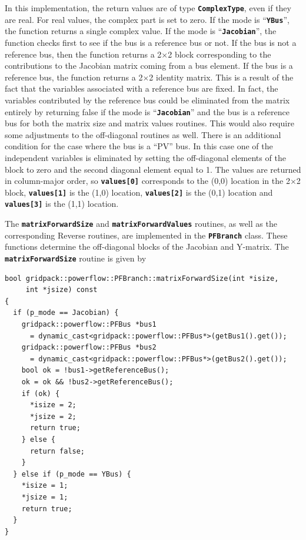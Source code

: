 In this implementation, the return values are of type \texttt{\textbf{ComplexType}}, even if they are real. For real values, the complex part is set to zero. If the mode is ``\texttt{\textbf{YBus}}'', the function returns a single complex value. If the mode is ``\texttt{\textbf{Jacobian}}'', the function checks first to see if the bus is a reference bus or not. If the bus is not a reference bus, then the function returns a 2$\mathrm{\times}$2 block corresponding to the contributions to the Jacobian matrix coming from a bus element. If the bus is a reference bus, the function returns a 2$\mathrm{\times}$2 identity matrix. This is a result of the fact that the variables associated with a reference bus are fixed. In fact, the variables contributed by the reference bus could be eliminated from the matrix entirely by returning false if the mode is ``\texttt{\textbf{Jacobian}}'' and the bus is a reference bus for both the matrix size and matrix values routines. This would also require some adjustments to the off-diagonal routines as well. There is an additional condition for the case where the bus is a ``PV'' bus. In this case one of the independent variables is eliminated by setting the off-diagonal elements of the block to zero and the second diagonal element equal to 1. The values are returned in column-major order, so \texttt{\textbf{values[0]}} corresponds to the (0,0) location in the 2$\mathrm{\times}$2 block, \texttt{\textbf{values[1]}} is the (1,0) location, \texttt{\textbf{values[2]}} is the (0,1) location and \texttt{\textbf{values[3]}} is the (1,1) location.

The \texttt{\textbf{matrixForwardSize}} and \texttt{\textbf{matrixForwardValues}} routines, as well as the corresponding Reverse routines, are implemented in the \texttt{\textbf{PFBranch}} class. These functions determine the off-diagonal blocks of the Jacobian and Y-matrix. The \texttt{\textbf{matrixForwardSize}} routine is given by

{
\color{red}
\begin{Verbatim}[fontseries=b]
bool gridpack::powerflow::PFBranch::matrixForwardSize(int *isize,
     int *jsize) const
{
  if (p_mode == Jacobian) {
    gridpack::powerflow::PFBus *bus1
      = dynamic_cast<gridpack::powerflow::PFBus*>(getBus1().get());
    gridpack::powerflow::PFBus *bus2
      = dynamic_cast<gridpack::powerflow::PFBus*>(getBus2().get());
    bool ok = !bus1->getReferenceBus();
    ok = ok && !bus2->getReferenceBus();
    if (ok) {
      *isize = 2;
      *jsize = 2;
      return true;
    } else {
      return false;
    }
  } else if (p_mode == YBus) {
    *isize = 1;
    *jsize = 1;
    return true;
  }
}
\end{Verbatim}
}

